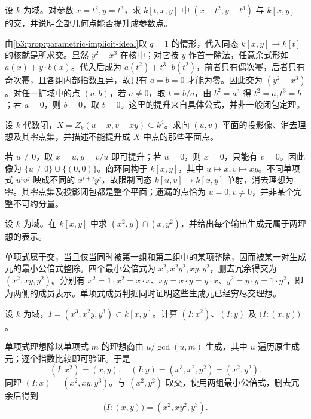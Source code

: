 \begin{exercise}\label{b3:ex:08-cusp-elimination}
	设 \(k\) 为域。对参数 \(x=t^2,y=t^3\)，求 \(k[t,x,y]\) 中 \((x-t^2,y-t^3)\) 与 \(k[x,y]\) 的交，并说明全部几何点能否提升成参数点。
\end{exercise}
\begin{solution}
	由\cref{b3:prop:parametric-implicit-ideal}取 \(q=1\) 的情形，代入同态 \(k[x,y]\rightarrow k[t]\) 的核就是所求交。显然 \(y^2-x^3\) 在核中；对它按 \(y\) 作首一除法，任意余式形如 \(a(x)+y\cdot b(x)\)。代入后成为 \(a(t^2)+t^3\cdot b(t^2)\)，前者只有偶次幂，后者只有奇次幂，且各组内部指数互异，故只有 \(a=b=0\) 才能为零。因此交为 \((y^2-x^3)\)。对任一扩域中的点 \((a,b)\)，若 \(a\ne0\)，取 \(t=b/a\)，由 \(b^2=a^3\) 得 \(t^2=a,t^3=b\)；若 \(a=0\)，则 \(b=0\)，取 \(t=0\)。这里的提升来自具体公式，并非一般闭包定理。
\end{solution}

\begin{exercise}\label{b3:ex:08-projection-missing}
	设 \(k\) 代数闭，\(X=Z_k(u-x,v-xy)\subseteq k^4\)。求向 \((u,v)\) 平面的投影像、消去理想及其零点集，并描述不能提升成 \(X\) 中点的那些平面点。
\end{exercise}
\begin{solution}
	若 \(u\ne0\)，取 \(x=u,y=v/u\) 即可提升；若 \(u=0\)，则 \(x=0\)，只能有 \(v=0\)。因此像为 \(\{u\ne0\}\cup\bigl\{(0,0)\bigr\}\)。商环同构于 \(k[x,y]\)，其中 \(u\mapsto x,v\mapsto xy\)。不同单项式 \(u^iv^j\) 映成不同的 \(x^{i+j}y^j\)，故限制同态 \(k[u,v]\to k[x,y]\) 单射，消去理想为零。其零点集及投影闭包都是整个平面；遗漏的点恰为 \(u=0,v\ne0\)，并非某个完整不可约分量。
\end{solution}

\begin{exercise}\label{b3:ex:08-intersection-example}
	设 \(k\) 为域。在 \(k[x,y]\) 中求 \((x^2,y)\cap(x,y^2)\)，并给出每个输出生成元属于两理想的表示。
\end{exercise}
\begin{solution}
	单项式属于交，当且仅当同时被第一组和第二组中的某项整除，因而被某一对生成元的最小公倍式整除。四个最小公倍式为 \(x^2,x^2y^2,xy,y^2\)，删去冗余得交为 \((x^2,xy,y^2)\)。分别有 \(x^2=1\cdot x^2=x\cdot x\)、\(xy=x\cdot y=y\cdot x\)、\(y^2=y\cdot y=1\cdot y^2\)，即为两侧的成员表示。单项式成员判据同时证明这些生成元已经穷尽交理想。
\end{solution}

\begin{exercise}\label{b3:ex:08-colon-example}
	设 \(k\) 为域，\(I=(x^3,x^2y,y^3)\subset k[x,y]\)。计算 \((I:x^2)\)、\((I:y)\) 及 \(\bigl(I:(x,y)\bigr)\)。
\end{exercise}
\begin{solution}
	单项式理想除以单项式 \(m\) 的理想商由 \(u/\gcd(u,m)\) 生成，其中 \(u\) 遍历原生成元；逐个指数比较即可验证。于是
	\[
		(I:x^2)=(x,y),\quad (I:y)=(x^3,x^2,y^2)=(x^2,y^2).
	\]
	同理 \((I:x)=(x^2,xy,y^3)\)。与 \((x^2,y^2)\) 取交，使用两组最小公倍式，删去冗余后得到
	\[
		\bigl(I:(x,y)\bigr)=(x^2,xy^2,y^3).
	\]
\end{solution}

